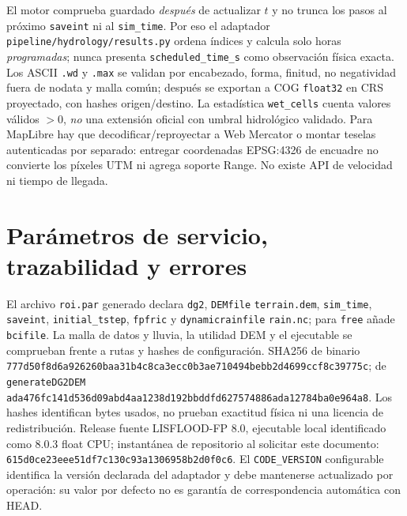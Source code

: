 \documentclass[11pt,a4paper]{article}
\newcommand{\src}[1]{\nolinkurl{#1}}
\begin{document}
El motor comprueba guardado \emph{después} de actualizar $t$ y no trunca los pasos al próximo \texttt{saveint} ni al \texttt{sim\_time}. Por eso el adaptador \src{pipeline/hydrology/results.py} ordena índices y calcula solo horas \emph{programadas}; nunca presenta \texttt{scheduled\_time\_s} como observación física exacta. Los ASCII \texttt{.wd} y \texttt{.max} se validan por encabezado, forma, finitud, no negatividad fuera de nodata y malla común; después se exportan a COG \texttt{float32} en CRS proyectado, con hashes origen/destino. La estadística \texttt{wet\_cells} cuenta valores válidos $>0$, \emph{no} una extensión oficial con umbral hidrológico validado. Para MapLibre hay que decodificar/reproyectar a Web Mercator o montar teselas autenticadas por separado: entregar coordenadas EPSG:4326 de encuadre no convierte los píxeles UTM ni agrega soporte Range. No existe API de velocidad ni tiempo de llegada.

\section{Parámetros de servicio, trazabilidad y errores}
\label{sec:operacion}
El archivo \texttt{roi.par} generado declara \texttt{dg2}, \src{DEMfile} \src{terrain.dem}, \texttt{sim\_time}, \texttt{saveint}, \src{initial_tstep}, \src{fpfric} y \src{dynamicrainfile} \src{rain.nc}; para \texttt{free} añade \texttt{bcifile}. La malla de datos y lluvia, la utilidad DEM y el ejecutable se comprueban frente a rutas y hashes de configuración. SHA256 de binario \src{777d50f8d6a926260baa31b4c8ca3ecc0b3ae710494bebb2d4699ccf8c39775c}; de \texttt{generateDG2DEM} \src{ada476fc141d536d09abd4aa1238d192bbddfd627574886ada12784ba0e964a8}. Los hashes identifican bytes usados, no prueban exactitud física ni una licencia de redistribución. Release fuente LISFLOOD-FP 8.0, ejecutable local identificado como 8.0.3 float CPU; instantánea de repositorio al solicitar este documento: \src{615d0ce23eee51df7c130c93a1306958b2d0f0c6}. El \texttt{CODE\_VERSION} configurable identifica la versión declarada del adaptador y debe mantenerse actualizado por operación: su valor por defecto no es garantía de correspondencia automática con HEAD.
\end{document}
